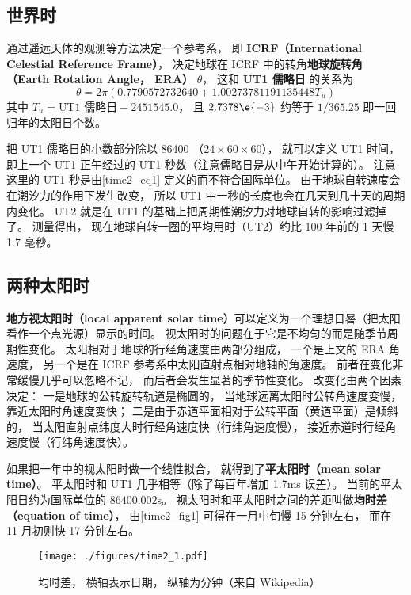 

\subsection{世界时}
通过遥远天体的观测等方法决定一个参考系， 即 \textbf{ICRF（International Celestial Reference Frame）}， 决定地球在 ICRF 中的转角\textbf{地球旋转角（Earth Rotation Angle， ERA）} $\theta$， 这和 \textbf{UT1 儒略日} 的关系为
\begin{equation}\label{time2_eq1}
\theta = 2\pi(0.7790572732640 + 1.00273781191135448 T_u)
\end{equation}
其中 $T_u = \text{UT1 儒略日} - 2451545.0$， 且 $2.7378\e{-3}$ 约等于 $1/365.25$ 即一回归年的太阳日个数。

把 UT1 儒略日的小数部分除以 86400 （$24\times 60\times 60$）， 就可以定义 UT1 时间， 即上一个 UT1 正午经过的 UT1 秒数（注意儒略日是从中午开始计算的）。 注意这里的 UT1 秒是由\autoref{time2_eq1} 定义的而不符合国际单位。 由于地球自转速度会在潮汐力的作用下发生改变， 所以 UT1 中一秒的长度也会在几天到几十天的周期内变化。 UT2 就是在 UT1 的基础上把周期性潮汐力对地球自转的影响过滤掉了。 测量得出， 现在地球自转一圈的平均用时（UT2）约比 100 年前的 1 天慢 1.7 毫秒。

\subsection{两种太阳时}
\textbf{地方视太阳时（local apparent solar time）}可以定义为一个理想日晷（把太阳看作一个点光源）显示的时间。 视太阳时的问题在于它是不均匀的而是随季节周期性变化。 太阳相对于地球的行经角速度由两部分组成， 一个是上文的 ERA 角速度， 另一个是在 ICRF 参考系中太阳直射点相对地轴的角速度。 前者在变化非常缓慢几乎可以忽略不记， 而后者会发生显著的季节性变化。 改变化由两个因素决定： 一是地球的公转旋转轨道是椭圆的， 当地球远离太阳时公转角速度变慢， 靠近太阳时角速度变快； 二是由于赤道平面相对于公转平面（黄道平面）是倾斜的， 当太阳直射点纬度大时行经角速度快（行纬角速度慢）， 接近赤道时行经角速度慢（行纬角速度快）。

如果把一年中的视太阳时做一个线性拟合， 就得到了\textbf{平太阳时（mean solar time）}。 平太阳时和 UT1 几乎相等（除了每百年增加 1.7ms 误差）。 当前的平太阳日约为国际单位的 $86400.002\mathrm{s}$。 视太阳时和平太阳时之间的差距叫做\textbf{均时差（equation of time）}， 由\autoref{time2_fig1} 可得在一月中旬慢 15 分钟左右， 而在 11 月初则快 17 分钟左右。

\begin{figure}[ht]
\centering
\texttt{[image: ./figures/time2\_1.pdf]}
\caption{均时差， 横轴表示日期， 纵轴为分钟（来自 Wikipedia）} \label{time2_fig1}
\end{figure}
